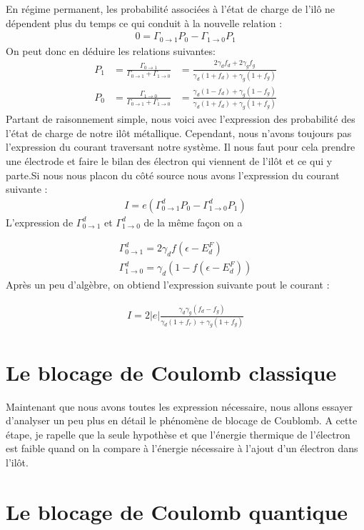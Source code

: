 En régime permanent, les probabilité associées à l'état de charge de l'il\^o ne dépendent plus du temps ce qui conduit à la nouvelle relation :
\begin{eqnarray}
0 = \Gamma_{0 \rightarrow 1}P_0 - \Gamma_{1 \rightarrow 0}P_1
\end{eqnarray}
On peut donc en déduire les relations suivantes:
\begin{eqnarray}
P_1 &= \frac{\Gamma_{0 \rightarrow 1}}{\Gamma_{0 \rightarrow 1} + \Gamma_{1 \rightarrow 0}} &= \frac{2\gamma_d f_d + 2 \gamma_g f_g}{\gamma_d(1+f_d) + \gamma_g(1 + f_g)} \\
P_0 &= \frac{\Gamma_{1 \rightarrow 0}}{\Gamma_{0 \rightarrow 1} + \Gamma_{1 \rightarrow 0}} &= \frac{\gamma_d(1-f_d) + \gamma_g(1 - f_g)}{\gamma_d(1+f_d) + \gamma_g(1 + f_g)}
\end{eqnarray}
Partant de raisonnement simple, nous voici avec l'expression des probabilité des l'état de charge de notre il\^ot métallique. Cependant, nous n'avons toujours pas l'expression du courant traversant notre système. Il nous faut pour cela prendre une électrode et faire le bilan des électron qui viennent de l'il\^ot et ce qui y parte.Si nous nous placon du c\^oté source nous avons l'expression du courant suivante :
\begin{eqnarray}
I = e (\Gamma_{0 \rightarrow 1}^d P_0 - \Gamma_{1 \rightarrow 0}^d P_1)
\end{eqnarray}
L'expression de $\Gamma_{0 \rightarrow 1}^d$ et $\Gamma_{1 \rightarrow 0}^d$ de la m\^eme façon on a 
 
\begin{eqnarray}
\Gamma_{0 \rightarrow 1}^d =  2\gamma_d f(\epsilon - E_d^F)\\
\Gamma_{1 \rightarrow 0}^d = \gamma_d (1- f(\epsilon - E_d^F)) 
\end{eqnarray}
Après un peu d'algèbre, on obtiend l'expression suivante pout le courant :

\begin{eqnarray}
I = 2 |e| \frac{\gamma_d \gamma_g (f_d - f_g)}{\gamma_d(1+f_r) + \gamma_g(1 + f_g)}
\end{eqnarray}


\section{Le blocage de Coulomb classique}
Maintenant que nous avons toutes les expression nécessaire, nous allons essayer d'analyser un peu plus en détail le phénomène de blocage de Coublomb. A cette étape, je rapelle que la seule hypothèse et que l'énergie thermique de l'électron est faible quand on la compare à l'énergie nécessaire à l'ajout d'un électron dans l'il\^ot.

\section{Le blocage de Coulomb quantique}

